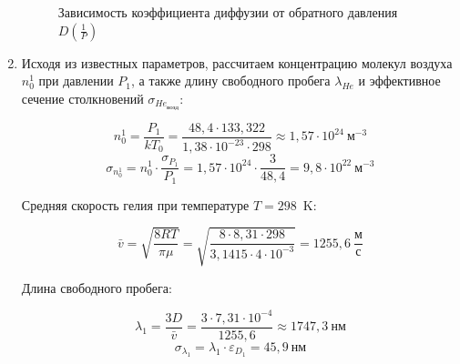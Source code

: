 \documentclass[a4paper,12pt]{article}
\begin{document}
\begin{enumerate}
    \begin{figure}[h!]
            \caption[]{\label{} Зависимость коэффициента диффузии от обратного давления $D(\frac{1}{P})$}
        \end{figure}
        


\item Исходя из известных параметров, рассчитаем концентрацию молекул воздуха $n_0^1$ при давлении $P_1$, а также длину свободного пробега $\lambda_{He}$ и эффективное сечение столкновений $\sigma_{He_{\text{возд}}}$:

\begin{equation*}
    n_0^1 = \frac{P_1}{kT_0} = \frac{48{,}4 \cdot 133{,}322}{1{,}38 \cdot 10^{-23} \cdot 298} \approx 1{,}57 \cdot 10^{24}~\text{м}^{-3}
\end{equation*}
\begin{equation*}
    \sigma_{n_0^1} = n_0^1 \cdot \frac{\sigma_{P_1}}{P_1} = 1{,}57 \cdot 10^{24} \cdot \frac{3}{48{,}4} = 9{,}8 \cdot 10^{22}~\text{м}^{-3}
\end{equation*}

Средняя скорость гелия при температуре $T = 298$~K:

\begin{equation*}
    \bar{v} = \sqrt{\frac{8RT}{\pi \mu}} = \sqrt{\frac{8 \cdot 8{,}31 \cdot 298}{3{,}1415 \cdot 4 \cdot 10^{-3}}} = 1255{,}6~\frac{\text{м}}{\text{с}}
\end{equation*}

Длина свободного пробега:

\begin{equation*}
    \lambda_1 = \frac{3D}{\bar{v}} = \frac{3 \cdot 7{,}31 \cdot 10^{-4}}{1255{,}6} \approx 1747{,}3~\text{нм}
\end{equation*}
\begin{equation*}
    \sigma_{\lambda_1} = \lambda_1 \cdot \varepsilon_{D_1} = 45{,}9~\text{нм}
\end{equation*}


\end{enumerate}
\end{document}
